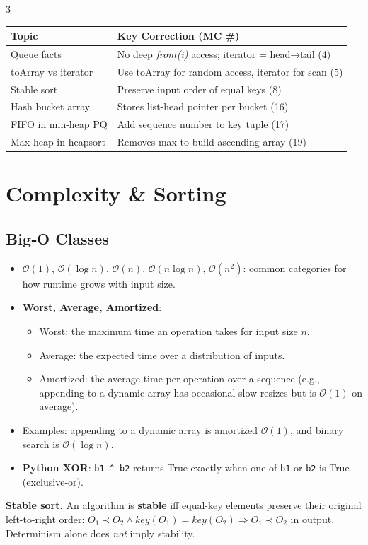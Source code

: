 \documentclass[6pt,landscape]{article}
\newcommand{\bigO}[1]{\ensuremath{\mathcal{O}(#1)}}
\newcommand{\keyword}[1]{\textbf{\textcolor{keywordcolor}{#1}}}
\newcommand{\op}[1]{\textit{\textcolor{opcolor}{#1}}}
\begin{document}
\begin{multicols}{3}
\begin{tabular}{|l|l|}
\hline
\textbf{Topic} & \textbf{Key Correction (MC \#)}\\\hline
Queue facts & No deep \op{front(i)} access; iterator = head→tail (4)\\
toArray vs iterator & Use toArray for random access, iterator for scan (5)\\
Stable sort & Preserve input order of equal keys (8)\\
Hash bucket array & Stores list-head pointer per bucket (16)\\
FIFO in min-heap PQ & Add sequence number to key tuple (17)\\
Max-heap in heapsort & Removes max to build ascending array (19)\\\hline
\end{tabular}


\section{Complexity \& Sorting}\label{sec:complexity}

\subsection{Big‐O Classes}\label{sec:bigoclasses}
\begin{itemize}
  \item \bigO{1}, \bigO{\log n}, \bigO{n}, \bigO{n\log n}, \bigO{n^2}: common categories for how runtime grows with input size.
  \item \textbf{Worst, Average, Amortized}:
    \begin{itemize}
      \item Worst: the maximum time an operation takes for input size \(n\).
      \item Average: the expected time over a distribution of inputs.
      \item Amortized: the average time per operation over a sequence (e.g., appending to a dynamic array has occasional slow resizes but is \bigO{1} on average).
    \end{itemize}
  \item Examples: appending to a dynamic array is amortized \bigO{1}, and binary search is \bigO{\log n}.
  \item \keyword{Python XOR}: \texttt{b1 \^{} b2} returns True exactly when one of \texttt{b1} or \texttt{b2} is True (exclusive‐or).
\end{itemize}
\textbf{Stable sort.}\label{sec:stable}
An algorithm is \keyword{stable} iff equal-key elements preserve their original
left-to-right order:  
\(O_1\!\prec\!O_2\land key(O_1)=key(O_2)\Rightarrow O_1\!\prec\!O_2\) in output.  
Determinism alone does \emph{not} imply stability.


\end{multicols}
\end{document}

